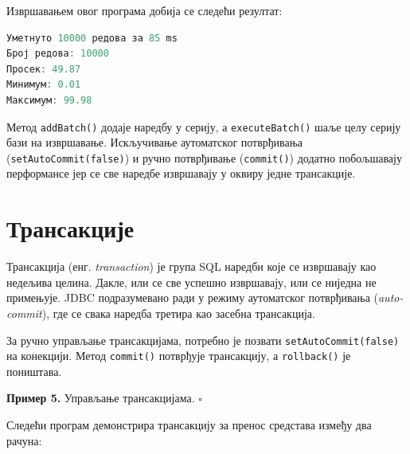 Извршавањем овог програма добија се следећи резултат:


\begin{lstlisting}[language=Java]
Уметнуто 10000 редова за 85 ms
Број редова: 10000
Просек: 49.87
Минимум: 0.01
Максимум: 99.98
\end{lstlisting}


Метод \texttt{addBatch()} додаје наредбу у серију, а \texttt{executeBatch()} шаље целу серију бази на извршавање. Искључивање аутоматског потврђивања (\texttt{setAutoCommit(false)}) и ручно потврђивање (\texttt{commit()}) додатно побољшавају перформансе јер се све наредбе извршавају у оквиру једне трансакције.


\section{Трансакције}

Трансакција (енг. \textit{transaction}) је група SQL наредби које се извршавају као недељива целина. Дакле, или се све успешно извршавају, или се ниједна не примењује. JDBC подразумевано ради у режиму аутоматског потврђивања (\textit{auto-commit}), где се свака наредба третира као засебна трансакција.

За ручно управљање трансакцијама, потребно је позвати \texttt{setAutoCommit(false)} на конекцији. Метод \texttt{commit()} потврђује трансакцију, а \texttt{rollback()} је поништава.


\bigskip

\noindent \textbf{Пример 5.} Управљање трансакцијама. $\square$

\medskip

Следећи програм демонстрира трансакцију за пренос средстава између два рачуна:


